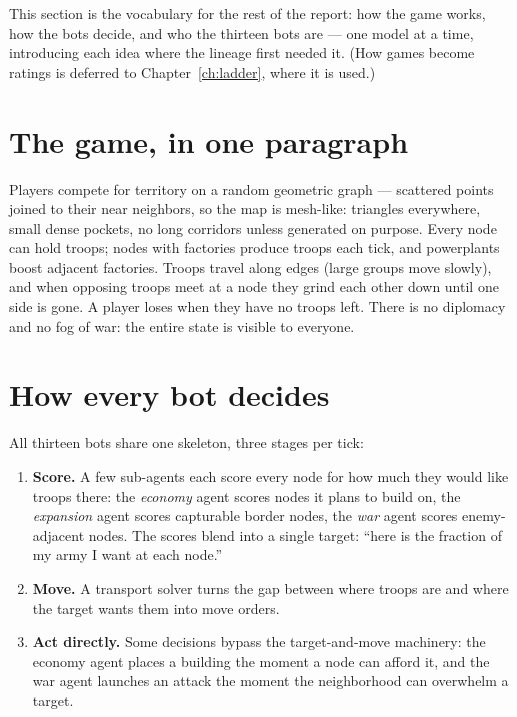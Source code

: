 
This section is the vocabulary for the rest of the report: how the game
works, how the bots decide, and who the thirteen bots are ---
one model at a time, introducing each idea where the lineage first needed
it. (How games become ratings is deferred to Chapter~\ref{ch:ladder},
where it is used.)

\section{The game, in one paragraph}
\label{sec:bg-game}

Players compete for territory on a random geometric graph --- scattered
points joined to their near neighbors, so the map is mesh-like: triangles
everywhere, small dense pockets, no long corridors unless generated on
purpose. Every node can hold troops; nodes with factories produce troops
each tick, and powerplants boost adjacent factories. Troops travel along
edges (large groups move slowly), and when opposing troops meet at a node
they grind each other down until one side is gone. A player loses when they
have no troops left. There is no diplomacy and no fog of war: the entire
state is visible to everyone.

\section{How every bot decides}
\label{sec:bg-bots}

All thirteen bots share one skeleton, three stages per tick:

\begin{enumerate}
  \item \textbf{Score.} A few sub-agents each score every node for how much
    they would like troops there: the \emph{economy} agent scores nodes it
    plans to build on, the \emph{expansion} agent scores capturable border
    nodes, the \emph{war} agent scores enemy-adjacent nodes. The scores
    blend into a single target: ``here is the fraction of my army I want at
    each node.''
  \item \textbf{Move.} A transport solver turns the gap between where troops
    are and where the target wants them into move orders.
  \item \textbf{Act directly.} Some decisions bypass the target-and-move
    machinery: the economy agent places a building the moment a node can
    afford it, and the war agent launches an attack the moment the
    neighborhood can overwhelm a target.
\end{enumerate}

